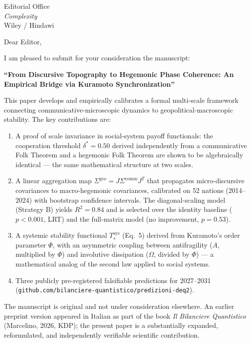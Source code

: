 \documentclass[12pt]{letter}
\date{\today}
\begin{document}
\begin{letter}{Editorial Office\\
\textit{Complexity}\\
Wiley / Hindawi}

\opening{Dear Editor,}

I am pleased to submit for your consideration the manuscript:

\medskip
\noindent\textbf{``From Discursive Topography to Hegemonic Phase Coherence: An Empirical Bridge via Kuramoto Synchronization''}
\medskip

This paper develops and empirically calibrates a formal multi-scale framework connecting communicative-microscopic dynamics to geopolitical-macroscopic stability. The key contributions are:

\begin{enumerate}
\item A proof of scale invariance in social-system payoff functionals: the cooperation threshold $\delta^* = 0.50$ derived independently from a communicative Folk Theorem and a hegemonic Folk Theorem are shown to be algebraically identical — the same mathematical structure at two scales.

\item A linear aggregation map $\Sigma^{\text{geo}} = J \Sigma^{\text{comm}} J^T$ that propagates micro-discursive covariances to macro-hegemonic covariances, calibrated on 52 nations (2014--2024) with bootstrap confidence intervals. The diagonal-scaling model (Strategy B) yields $R^2 = 0.84$ and is selected over the identity baseline ($p < 0.001$, LRT) and the full-matrix model (no improvement, $p = 0.53$).

\item A systemic stability functional $T_s^{\text{sys}}$ (Eq.~5) derived from Kuramoto's order parameter $\Phi$, with an asymmetric coupling between antifragility ($A$, multiplied by $\Phi$) and involutive dissipation ($\Omega$, divided by $\Phi$) — a mathematical analog of the second law applied to social systems.

\item Three publicly pre-registered falsifiable predictions for 2027--2031 (\texttt{github.com/bilanciere-quantistico/predizioni-deq2}).
\end{enumerate}

The manuscript is original and not under consideration elsewhere. An earlier preprint version appeared in Italian as part of the book \textit{Il Bilanciere Quantistico} (Marcelino, 2026, KDP); the present paper is a substantially expanded, reformulated, and independently verifiable scientific contribution.


\end{letter}
\end{document}

